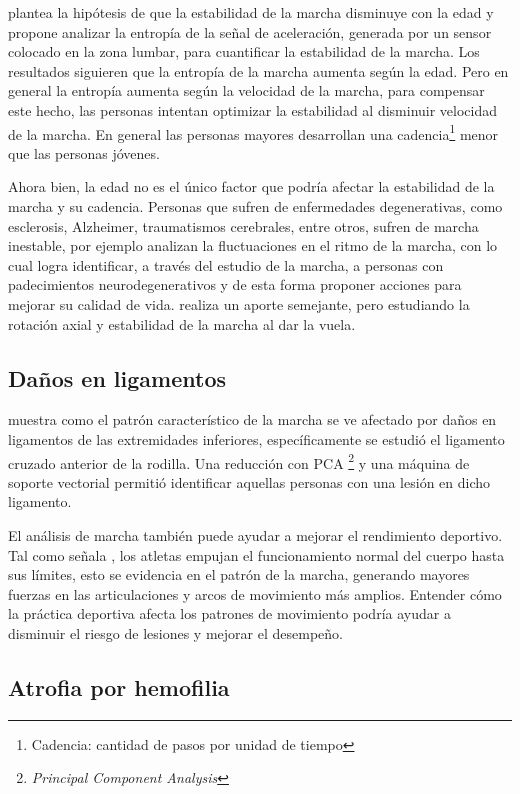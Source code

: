 \cite{arif} plantea la hipótesis de que la estabilidad de la marcha disminuye con la edad y propone analizar la entropía de la señal de aceleración, generada por un sensor colocado en la zona lumbar, para cuantificar la estabilidad de la marcha. Los resultados siguieren que la entropía de la marcha aumenta según la edad. Pero en general la entropía aumenta según la velocidad de la marcha, para compensar este hecho, las personas intentan optimizar la estabilidad al disminuir velocidad de la marcha. En general las personas mayores desarrollan una cadencia\footnote{Cadencia: cantidad de pasos por unidad de tiempo} menor que las personas jóvenes. 

Ahora bien, la edad no es el único factor que podría afectar la estabilidad de la marcha y su cadencia. Personas que sufren de enfermedades degenerativas, como esclerosis, Alzheimer, traumatismos cerebrales, entre otros, sufren de marcha inestable, por ejemplo \cite{ren, wu} analizan la fluctuaciones en el ritmo de la marcha, con lo cual logra identificar, a través del estudio de la marcha, a personas con padecimientos neurodegenerativos y de esta forma proponer acciones para mejorar su calidad de vida. \cite{yang} realiza un aporte semejante, pero estudiando la rotación axial y estabilidad de la marcha al dar la vuela.  

\subsection{Daños en ligamentos}

\cite{christian} muestra como el patrón característico de la marcha se ve afectado por daños en ligamentos de las extremidades inferiores, específicamente se estudió el ligamento cruzado anterior de la rodilla. Una reducción con PCA \footnote{\emph{Principal Component Analysis}} y una máquina de soporte vectorial permitió identificar aquellas personas con una lesión en dicho ligamento. 

El análisis de marcha también puede ayudar a mejorar el rendimiento deportivo. Tal como señala \cite{perry}, los atletas empujan el funcionamiento normal del cuerpo hasta sus límites, esto se evidencia en el patrón de la marcha, generando mayores fuerzas en las articulaciones y arcos de movimiento más amplios. Entender cómo la práctica deportiva afecta los patrones de movimiento podría ayudar a disminuir el riesgo de lesiones y mejorar el desempeño.  

\subsection{Atrofia por hemofilia}

